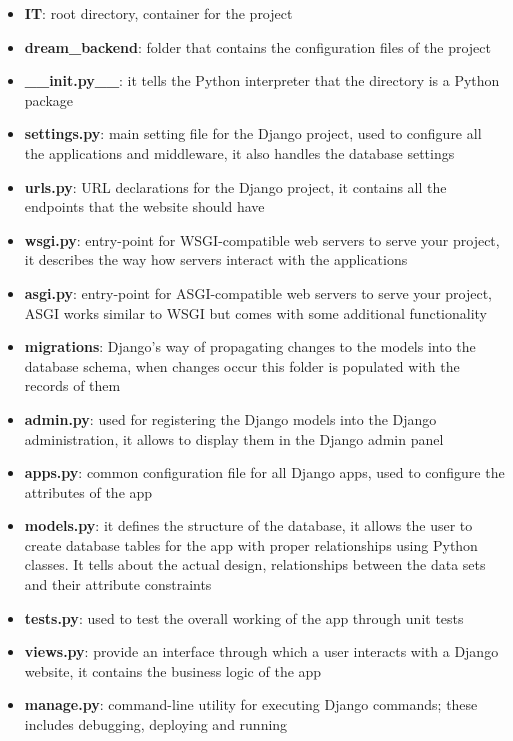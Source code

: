 \documentclass[table, 12pt]{article}
\begin{document}
\begin{itemize}
    \item \textbf{IT}: root directory, container for the project
    \item \textbf{dream\_backend}: folder that contains the configuration files of the project
    \item \textbf{\_\_init.py\_\_}: it tells the Python interpreter that the directory is a Python package
    \item \textbf{settings.py}: main setting file for the Django project, used to configure all the applications and middleware, it also handles the database settings
    \item \textbf{urls.py}: URL declarations for the Django project, it contains all the endpoints that the website should have
    \item \textbf{wsgi.py}: entry-point for WSGI-compatible web servers to serve your project, it describes the way how servers interact with the applications
    \item \textbf{asgi.py}: entry-point for ASGI-compatible web servers to serve your project, ASGI works similar to WSGI but comes with some additional functionality
    \item \textbf{migrations}: Django's way of propagating changes to the models into the database schema, when changes occur this folder is populated with the records of them
    \item \textbf{admin.py}: used for registering the Django models into the Django administration, it allows to display them in the Django admin panel
    \item \textbf{apps.py}: common configuration file for all Django apps, used to configure the attributes of the app
    \item \textbf{models.py}: it defines the structure of the database, it allows the user to create database tables for the app with proper relationships using Python classes. It tells about the actual design, relationships between the data sets and their attribute constraints
    \item \textbf{tests.py}: used to test the overall working of the app through unit tests
    \item \textbf{views.py}: provide an interface through which a user interacts with a Django website, it contains the business logic of the app
    \item \textbf{manage.py}: command-line utility for executing Django commands; these includes debugging, deploying and running
\end{itemize}
\end{document}
